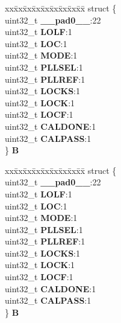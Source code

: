 \begin{DoxyCompactItemize}
\begin{tabbing}
\end{tabbing}\item 
\mbox{\label{unionFMPLL__tag_1_1FMPLL__SYNSR__tag_a84214a1d52f4fddca652bad60955ef5c}} 
\begin{tabbing}
xx\=xx\=xx\=xx\=xx\=xx\=xx\=xx\=xx\=\kill
struct \{\\
\>uint32\_t {\bfseries \_\_pad0\_\_}:22\\
\>uint32\_t {\bfseries LOLF}:1\\
\>uint32\_t {\bfseries LOC}:1\\
\>uint32\_t {\bfseries MODE}:1\\
\>uint32\_t {\bfseries PLLSEL}:1\\
\>uint32\_t {\bfseries PLLREF}:1\\
\>uint32\_t {\bfseries LOCKS}:1\\
\>uint32\_t {\bfseries LOCK}:1\\
\>uint32\_t {\bfseries LOCF}:1\\
\>uint32\_t {\bfseries CALDONE}:1\\
\>uint32\_t {\bfseries CALPASS}:1\\
\} {\bfseries B}\\

\end{tabbing}\item 
\mbox{\label{unionFMPLL__tag_1_1FMPLL__SYNSR__tag_a59ec80cbe0efb2e44e068da510eab6fe}} 
\begin{tabbing}
xx\=xx\=xx\=xx\=xx\=xx\=xx\=xx\=xx\=\kill
struct \{\\
\>uint32\_t {\bfseries \_\_pad0\_\_}:22\\
\>uint32\_t {\bfseries LOLF}:1\\
\>uint32\_t {\bfseries LOC}:1\\
\>uint32\_t {\bfseries MODE}:1\\
\>uint32\_t {\bfseries PLLSEL}:1\\
\>uint32\_t {\bfseries PLLREF}:1\\
\>uint32\_t {\bfseries LOCKS}:1\\
\>uint32\_t {\bfseries LOCK}:1\\
\>uint32\_t {\bfseries LOCF}:1\\
\>uint32\_t {\bfseries CALDONE}:1\\
\>uint32\_t {\bfseries CALPASS}:1\\
\} {\bfseries B}\\

\end{tabbing}\end{DoxyCompactItemize}


